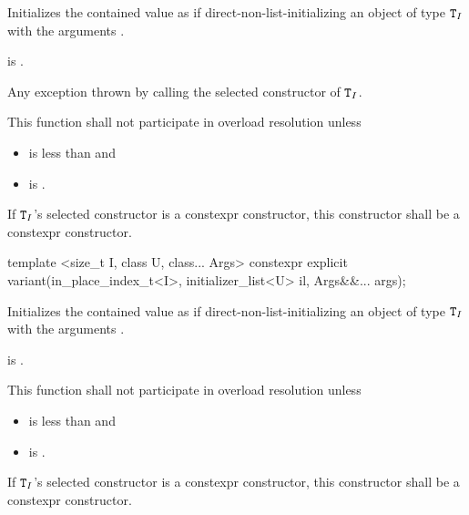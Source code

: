 \begin{itemdescr}
\pnum
\effects
Initializes the contained value as if direct-non-list-initializing
an object of type $\texttt{T}_I$
with the arguments .

\pnum
\postconditions
{} is .

\pnum
\throws
Any exception thrown by calling the selected constructor of $\texttt{T}_I$.

\pnum
\remarks
This function shall not participate in overload resolution unless
\begin{itemize}
\item
{} is less than  and
\item
{} is .
\end{itemize}
If $\texttt{T}_I$'s selected constructor is a constexpr constructor, this
constructor shall be a constexpr constructor.
\end{itemdescr}

%
\begin{itemdecl}
template <size_t I, class U, class... Args>
  constexpr explicit variant(in_place_index_t<I>, initializer_list<U> il, Args&&... args);
\end{itemdecl}

\begin{itemdescr}
\pnum
\effects
Initializes the contained value as if direct-non-list-initializing
an object of type $\texttt{T}_I$
with the arguments .

\pnum
\postconditions
{} is .

\pnum
\remarks
This function shall not participate in overload resolution unless
\begin{itemize}
\item
{} is less than  and
\item
{} is .
\end{itemize}
If $\texttt{T}_I$'s selected constructor is a constexpr constructor, this
constructor shall be a constexpr constructor.
\end{itemdescr}

